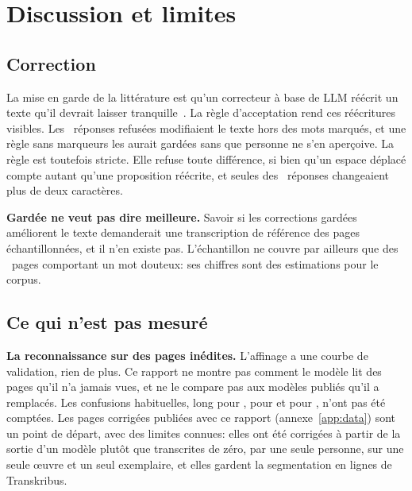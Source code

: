 \section{Discussion et limites}
\label{sec:errors}
\label{sec:limitations}

\subsection{Correction}

La mise en garde de la littérature est qu'un correcteur à base de LLM réécrit
un texte qu'il devrait laisser tranquille~\cite{kanerva2025nofreelunches,
ehrmann2026hipeocrepair}. La règle d'acceptation rend ces réécritures visibles.
Les \corrRewritesCaught{}~réponses refusées modifiaient le texte hors des mots
marqués, et une règle sans marqueurs les aurait gardées sans que personne ne
s'en aperçoive. La règle est toutefois stricte. Elle refuse toute différence,
si bien qu'un espace déplacé compte autant qu'une proposition réécrite, et
seules \corrRewritesSubstantial{} des \corrRewritesCaught{}~réponses changeaient
plus de deux caractères.

\textbf{Gardée ne veut pas dire meilleure.} Savoir si les corrections gardées
améliorent le texte demanderait une transcription de référence des pages
échantillonnées, et il n'en existe pas. L'échantillon ne couvre par ailleurs
que \corrPages{} des \corrReachPagesWithSpan{}~pages comportant un mot douteux:
ses chiffres sont des estimations pour le corpus.

\subsection{Ce qui n'est pas mesuré}

\textbf{La reconnaissance sur des pages inédites.} L'affinage a une courbe de
validation, rien de plus. Ce rapport ne montre pas comment le modèle lit des
pages qu'il n'a jamais vues, et ne le compare pas aux modèles publiés qu'il a
remplacés. Les confusions habituelles,  long pour ,  pour
 et  pour , n'ont pas été comptées. Les pages corrigées
publiées avec ce rapport (annexe~\ref{app:data}) sont un point de départ, avec
des limites connues: elles ont été corrigées à partir de la sortie d'un modèle
plutôt que transcrites de zéro, par une seule personne, sur une seule œuvre et
un seul exemplaire, et elles gardent la segmentation en lignes de Transkribus.

